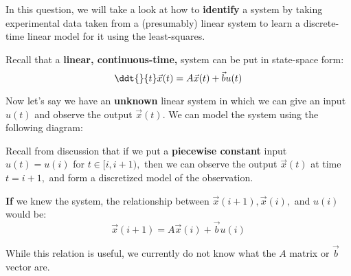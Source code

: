 

In this question, we will take a look at how to \textbf{identify} a system by taking experimental data taken from a (presumably) linear system to learn a discrete-time linear model for it using the least-squares.

Recall that a \textbf{linear, continuous-time,} system can be put in state-space form:
\begin{equation}
\ddt{}{t} \vec{x}(t) = A \vec{x}(t) + \vec{b} u(t)
\end{equation}

Now let's say we have an \textbf{unknown} linear system in which we can give an input $u(t)$ and observe the output $\vec{x}(t).$ We can model the system using the following diagram:
\begin{center}
\end{center}

Recall from discussion that if we put a \textbf{piecewise constant} input $u(t) = u(i)$ for $t \in [i, i+1),$ then we can observe the output $\vec{x}(t)$ at time $t = i + 1,$ and form a discretized model of the observation.

\begin{center}
\end{center}

\textbf{If} we knew the system, the relationship between $\vec{x}(i+1), \vec{x}(i),$ and $u(i)$ would be:
\begin{equation}
\vec{x}(i + 1) = A \vec{x}(i) + \vec{b} u(i)
\end{equation}

While this relation is useful, we currently do not know what the $A$ matrix or $\vec{b}$ vector are.

